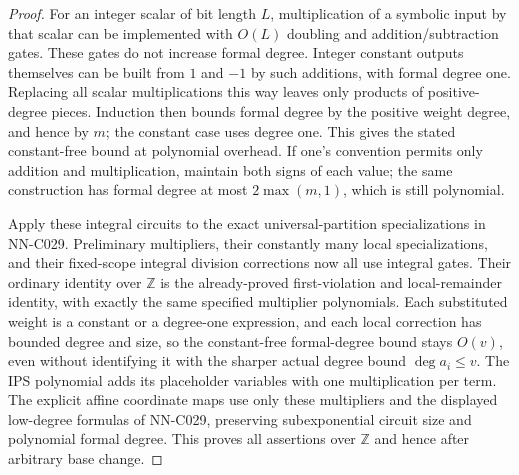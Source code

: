 \begin{proof}
For an integer scalar of bit length $L$, multiplication of a symbolic input by that scalar can be implemented with $O(L)$ doubling and addition/subtraction gates. These gates do not increase formal degree. Integer constant outputs themselves can be built from $1$ and $-1$ by such additions, with formal degree one. Replacing all scalar multiplications this way leaves only products of positive-degree pieces. Induction then bounds formal degree by the positive weight degree, and hence by $m$; the constant case uses degree one. This gives the stated constant-free bound at polynomial overhead. If one's convention permits only addition and multiplication, maintain both signs of each value; the same construction has formal degree at most $2\max(m,1)$, which is still polynomial.

Apply these integral circuits to the exact universal-partition specializations in NN-C029. Preliminary multipliers, their constantly many local specializations, and their fixed-scope integral division corrections now all use integral gates. Their ordinary identity over $\mathbb Z$ is the already-proved first-violation and local-remainder identity, with exactly the same specified multiplier polynomials. Each substituted weight is a constant or a degree-one expression, and each local correction has bounded degree and size, so the constant-free formal-degree bound stays $O(v)$, even without identifying it with the sharper actual degree bound $\deg a_i\leq v$. The IPS polynomial adds its placeholder variables with one multiplication per term. The explicit affine coordinate maps use only these multipliers and the displayed low-degree formulas of NN-C029, preserving subexponential circuit size and polynomial formal degree. This proves all assertions over $\mathbb Z$ and hence after arbitrary base change.


\end{proof}
